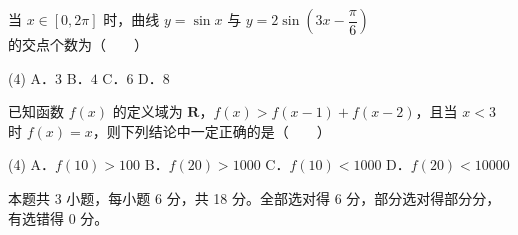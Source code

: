 \begin{question}
当 $x\in[0,2\pi]$ 时，曲线 $y=\sin x$ 与 $y=2\sin\left(3x-\dfrac{\pi}{6}\right)$ 的交点个数为\mbox{（　　）}

\begin{gkopts}(4)
\task A．$3$
\task B．$4$
\task C．$6$
\task D．$8$
\end{gkopts}

\end{question}
\begin{question}
已知函数 $f(x)$ 的定义域为 $\mathbf R$，$f(x)>f(x-1)+f(x-2)$，且当 $x<3$ 时 $f(x)=x$，则下列结论中一定正确的是\mbox{（　　）}

\begin{gkopts}(4)
\task A．$f(10)>100$
\task B．$f(20)>1000$
\task C．$f(10)<1000$
\task D．$f(20)<10000$
\end{gkopts}

\par\medskip

\end{question}

\begin{gktip}
本题共 3 小题，每小题 6 分，共 18 分。全部选对得 6 分，部分选对得部分分，有选错得 0 分。
\end{gktip}

